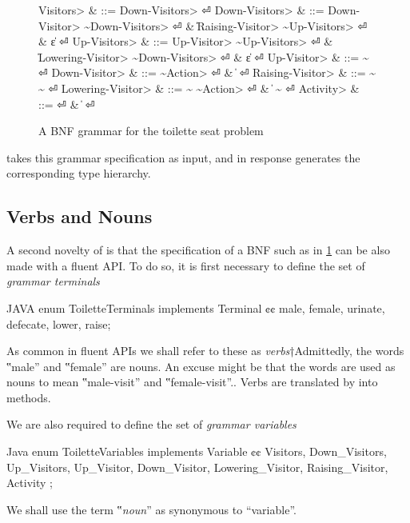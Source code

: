 \begin{figure}[H]
  \begin{Grammar}
    \begin{aligned}
      \<Visitors>         & ::= \<Down-Visitors> \hfill⏎
      \<Down-Visitors>    & ::= \<Down-Visitor> \~\<Down-Visitors> \hfill⏎
      {}                  & \| \<Raising-Visitor> \~\<Up-Visitors> \hfill⏎
      {}                  & \| ε \hfill⏎
      \<Up-Visitors>      & ::= \<Up-Visitor> \~\<Up-Visitors> \hfill⏎
      {}                  & \| \<Lowering-Visitor> \~\<Down-Visitors> \hfill⏎
      {}                  & \| ε \hfill⏎
      \<Up-Visitor>       & ::=  \~ \hfill⏎
      \<Down-Visitor>     & ::=  \~\<Action> \hfill⏎
                          & \|   \hfill⏎
      \<Raising-Visitor>  & ::=  \~ \~ \hfill⏎
      \<Lowering-Visitor> & ::=  \~ \~\<Action> \hfill⏎
                          & \|  \~  \hfill⏎
      \<Activity>         & ::=  \hfill⏎
                          & \|  \hfill⏎
    \end{aligned}
  \end{Grammar}
  \caption{A BNF grammar for the toilette seat problem}
  \label{Figure:BNF}
\end{figure}

\Self takes this grammar specification as input, and in response
  generates the corresponding
  \Java type hierarchy.

\subsection{Verbs and Nouns}
A second novelty of \Self is that the specification of a BNF such as in 
  \cref{Figure:BNF} can be also made with a \Java fluent API\@.
To do so, it is first necessary to
  define the set of \emph{grammar terminals}
  \begin{code}{JAVA}
enum ToiletteTerminals implements Terminal {¢¢
  male, female,
  urinate, defecate,
  lower, raise;
}
\end{code}
As common in fluent APIs we shall refer to these
as \emph{verbs}†{Admittedly, the words ‟male” and ‟female” are nouns. 
  An excuse might be that the words are used as nouns to mean ‟male-visit” and ‟female-visit”.}.
Verbs are translated by \Self into methods.

We are also required to define the set of \emph{grammar variables}
\begin{code}{Java}
enum ToiletteVariables implements Variable {¢¢
  Visitors, Down_Visitors, Up_Visitors,
  Up_Visitor, Down_Visitor,
  Lowering_Visitor, Raising_Visitor,
  Activity
};
\end{code}
  We shall use the term ‟\emph{noun}” as synonymous to ``variable''.

